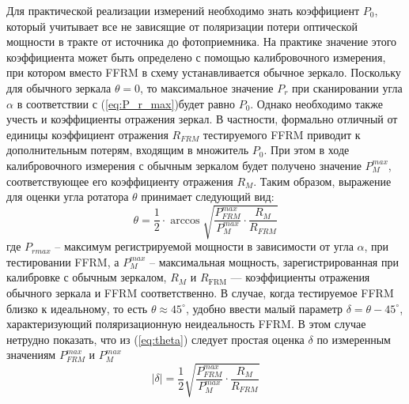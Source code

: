\documentclass{article}
\begin{document}
Для практической реализации измерений необходимо знать коэффициент $P_0$, который учитывает все не зависящие от поляризации потери оптической мощности в тракте от источника до фотоприемника.
На практике значение этого коэффициента может быть определено с помощью калибровочного измерения, при котором вместо FFRM в схему устанавливается обычное зеркало.
Поскольку для обычного зеркала $\theta = 0$, то максимальное значение $P_r$ при сканировании угла $\alpha$ в соответствии с (\ref{eq:P_r_max})будет равно $P_0$.
Однако необходимо также учесть и коэффициенты отражения зеркал.
В частности, формально отличный от единицы коэффициент отражения $R_{FRM}$ тестируемого FFRM приводит к дополнительным потерям, входящим в множитель $P_0$.
При этом в ходе калибровочного измерения с обычным зеркалом будет получено значение $P_M^{max}$, соответствующее его коэффициенту отражения $R_M$.
Таким образом, выражение для оценки угла ротатора $\theta$ принимает следующий вид:
\begin{equation}
    \label{eq:theta}
    \theta =\frac{1}{2}\cdot\arccos\sqrt{\frac{P_{FRM}^{max}}{P_M^{max}}\cdot\frac{R_M}{R_{FRM}}}
\end{equation}
где $P_{rmax}$ – максимум регистрируемой мощности в зависимости от угла $\alpha$, при тестировании FFRM, а $P_M^{max}$ – максимальная мощность, зарегистрированная при калибровке с обычным зеркалом, $R_M$ и $R_{\text{FRM}}$ — коэффициенты отражения обычного зеркала и FFRM соответственно.
В случае, когда тестируемое FFRM близко к идеальному, то есть $\theta \approx 45^\circ$, удобно ввести малый параметр $\delta = \theta - 45^\circ$, характеризующий поляризационную неидеальность FFRM.
В этом случае нетрудно показать, что из (\ref{eq:theta}) следует простая оценка $\delta$ по измеренным значениям $P_{FRM}^{max}$ и $P_M^{max}$
\begin{equation}
    \label{eq:delta}
    |\delta| =\frac{1}{2}\sqrt{\frac{P_{FRM}^{max}}{P_M^{max}}\cdot\frac{R_M}{R_{FRM}}}
\end{equation}
\end{document}
